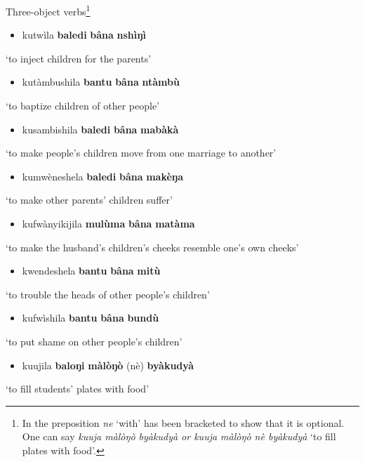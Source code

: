 \documentclass[output=paper]{langscibook}
\begin{document}
\ea%
    \label{ex:lukusa:29}
    \z

           Three-object verbs\footnote{In  the preposition \textit{ne} ‘with’ has been bracketed to show that it is optional. One can say \textit{kuuja màlòŋò byàkudyà or kuuja màlò}\textrm{\textit{ŋ}}\textit{ò nè byàkudyà} ‘to fill plates with food’.}

\begin{itemize}
\item kutwìla \textbf{baledi} \textbf{bâna} \textbf{nshìŋì}
\end{itemize}
\glt ‘to inject children for the parents’

\begin{itemize}
\item kutàmbushila \textbf{bantu} \textbf{bâna} \textbf{ntàmbù}
\end{itemize}
\glt ‘to baptize children of other people’

\begin{itemize}
\item kusambishila \textbf{baledi} \textbf{bâna} \textbf{mabàkà}
\end{itemize}
\glt ‘to make people’s children move from one marriage to another’

\begin{itemize}
\item kumwèneshela \textbf{baledi} \textbf{bâna} \textbf{makèŋa}
\end{itemize}
\glt ‘to make other parents’ children suffer’

\begin{itemize}
\item kufwànyikijila \textbf{mulùma} \textbf{bâna} \textbf{matàma}
\end{itemize}
\glt ‘to make the husband’s children’s cheeks resemble one’s own cheeks’

\begin{itemize}
\item kwendeshela \textbf{bantu} \textbf{bâna} \textbf{mitù}
\end{itemize}
\glt ‘to trouble the heads of other people’s children’

\begin{itemize}
\item kufwìshila \textbf{bantu} \textbf{bâna} \textbf{bundù}
\end{itemize}
\glt ‘to put shame on other people’s children’

\begin{itemize}
\item kuujila \textbf{baloŋi} \textbf{màlòŋò} (nè) \textbf{byàkudyà}
\end{itemize}
\glt ‘to fill students’ plates with food’
\end{document}

